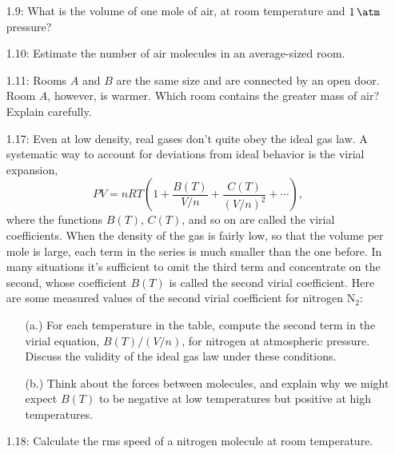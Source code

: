 \documentclass[a4paper, 12pt]{config/homework}
\begin{document}
\begin{enumerate}
\begin{enumerate}[label=(\alph*.)]
\end{enumerate}
\pagebreak
\item[1.9:] What is the volume of one mole of air, at room temperature and \(\qty{1}{\atm}\) pressure?



\vspace{\baselineskip}
\item[1.10:] Estimate the number of air molecules in an average-sized room.


\vspace{\baselineskip}
\item[1.11:] Rooms \(A\) and \(B\) are the same size and are connected by an open door. Room \(A\), however, is warmer. Which room contains the greater mass of air? Explain carefully.



\pagebreak
\item [1.17:] Even at low density, real gases don't quite obey the ideal gas law. A systematic way to account for deviations from ideal behavior is the virial expansion,
\[PV=nRT\left(1 + \frac{B(T)}{V/n} + \frac{C(T)}{(V/n)^2} + \cdots\right),\]
where the functions \(B(T)\), \(C(T)\), and so on are called the virial coefficients. When the density of the gas is fairly low, so that the volume per mole is large, each term in the series is much smaller than the one before. In many situations it's sufficient to omit the third term and concentrate on the second, whose coefficient \(B(T)\) is called the second virial coefficient. Here are some measured values of the second virial coefficient for nitrogen \(\text{N}_2\):
\begin{enumerate}
\item[(a.)] For each temperature in the table, compute the second term in the virial equation, \(B(T)/(V/n)\), for nitrogen at atmospheric pressure. Discuss the validity of the ideal gas law under these conditions.



\item[(b.)] Think about the forces between molecules, and explain why we might expect \(B(T)\) to be negative at low temperatures but positive at high temperatures.



\end{enumerate}
\pagebreak
\item[1.18:] Calculate the rms speed of a nitrogen molecule at room temperature.




\end{enumerate}
\end{document}
